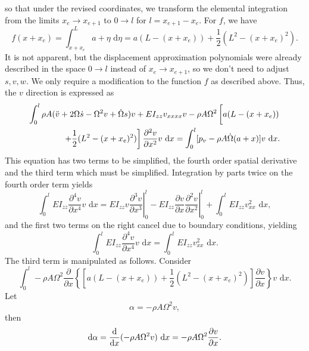so that under the revised coordinates, we transform the elemental integration from the limits $x_e\rightarrow x_{e+1}$ to $0\rightarrow l$ for $l = x_{e+1}-x_e$. For $f$, we have
\begin{equation}
f(x+x_e) = \int_{x+x_e}^L a+\eta \text{ d}\eta = a(L-(x+x_e))+\frac{1}{2}(L^2-(x+x_e)^2).
\end{equation}
It is not apparent, but the displacement approximation polynomials were already described in the space $0\rightarrow l$ instead of $x_e\rightarrow x_{e+1}$, so we don't need to adjust $s,v,w$. We only require a modification to the function $f$ as described above. Thus, the $v$ direction is expressed as
\begin{eqnarray}
\int_0^l\rho A(\ddot v + 2\Omega\dot s-\Omega^2v+\dot\Omega s)v+EI_{zz}v_{xxxx}v-\rho A\Omega^2\left[a(L-(x+x_e))\vphantom{\frac{0}{0}}\right.\\
\left.+\frac{1}{2}(L^2-(x+x_e)^2)\right]\frac{\partial^2 v}{\partial x^2} v\text{ d}x = \int_0^l[p_v - \rho A\dot\Omega(a+x)]v\text{ d}x. \nonumber
\end{eqnarray}
This equation has two terms to be simplified, the fourth order spatial derivative and the third term which must be simplified. Integration by parts twice on the fourth order term yields
\begin{equation}
\int_0^lEI_{zz}\frac{\partial^4 v}{\partial x^4}v\text{ d}x = \left.EI_{zz}v\frac{\partial^3 v}{\partial x^3}\right|_0^l-\left.EI_{zz}\frac{\partial v}{\partial x}\frac{\partial^2 v}{\partial x^2}\right|_0^l + \int_0^lEI_{zz}v_{xx}^2\text{ d}x,
\label{eq:v.disc.int.by.parts.1}
\end{equation}
and the first two terms on the right cancel due to boundary conditions, yielding
\begin{equation}
\int_0^lEI_{zz}\frac{\partial^4 v}{\partial x^4}v\text{ d}x =  \int_0^lEI_{zz}v_{xx}^2\text{ d}x.
\end{equation}
The third term is manipulated as follows. Consider
\begin{equation}
\int_0^l-\rho A\Omega^2\frac{\partial}{\partial x}\left\lbrace \left[a(L-(x+x_e))+\frac{1}{2}(L^2-(x+x_e)^2)\right]\frac{\partial v}{\partial x}\right\rbrace v\text{ d}x.
\end{equation}
Let
\begin{equation}
\alpha = -\rho A\Omega^2v,
\end{equation}
then
\begin{equation}
\text d\alpha = \frac{\text d}{\text dx}(-\rho A\Omega^2v)\text{ d}x = -\rho A\Omega^2\frac{\partial v}{\partial x}.
\end{equation}
